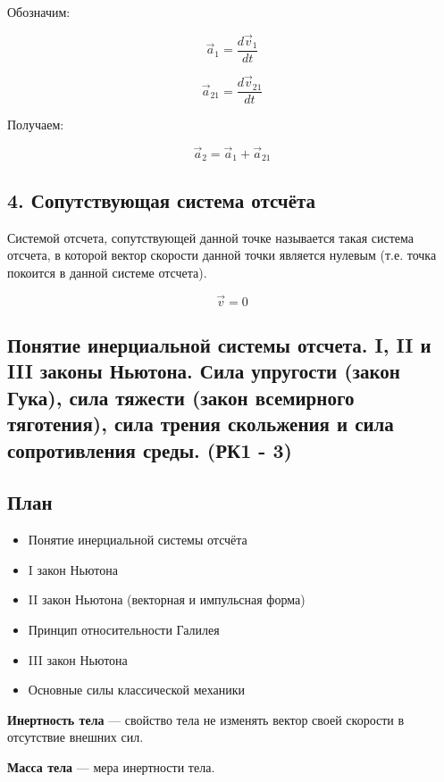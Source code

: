 \documentclass[a4paper,12pt]{article}
\begin{document}
Обозначим:

\[
\vec a_1
=
\frac{d\vec v_1}{dt}
\]

\[
\vec a_{21}
=
\frac{d\vec v_{21}}{dt}
\]

Получаем:

\[
\vec a_2
=
\vec a_1
+
\vec a_{21}
\]

\subsection*{4. Сопутствующая система отсчёта}

\begin{definitionbox}
Системой отсчета, сопутствующей
данной точке называется такая система отсчета, в которой вектор скорости данной точки является нулевым (т.е. точка покоится в данной системе отсчета). 
\end{definitionbox}

\[
\vec v = 0
\]

\subsection{Понятие инерциальной системы отсчета. I, II и III законы Ньютона. Сила упругости
(закон Гука), сила тяжести (закон всемирного тяготения), сила трения скольжения
и сила сопротивления среды. (РК1 - 3) }

\subsection*{План}
\begin{itemize}
\item Понятие инерциальной системы отсчёта
\item I закон Ньютона
\item II закон Ньютона (векторная и импульсная форма)
\item Принцип относительности Галилея
\item III закон Ньютона
\item Основные силы классической механики
\end{itemize}

\vspace{0.8em}

\begin{definitionbox}
\textbf{Инертность тела} — свойство тела не изменять вектор своей скорости в отсутствие внешних сил.
\end{definitionbox} 

\begin{definitionbox}
\textbf{Масса тела} — мера инертности тела.
\end{definitionbox}
\end{document}
